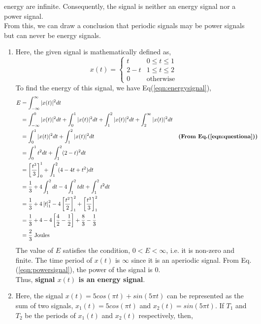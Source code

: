 \documentclass{article}[12 pt]
\begin{document}
\begin{solution}
{energy are infinite. Consequently, the signal is neither an energy signal nor a
power signal.\\From this, we can draw a conclusion that periodic signals may be power signals but can never be energy signals.
\begin{enumerate}
\item Here, the given signal is mathematically defined as,
\begin{equation}
\label{eqn:questiona}
x(t)=\begin{cases}
  t & 0 \leq t \leq 1\\
  2-t & 1 \leq t \leq 2\\
  0 & \text{otherwise}
\end{cases}
\end{equation}
To find the energy of this signal, we have Eq(\ref{eqn:energysignal}),
\begin{equation*}
\begin{aligned}
E&=\int_{-\infty}^\infty |x(t)|^2 dt\\
&=\int_{-\infty}^0 |x(t)|^2 dt +\int_{0}^1 |x(t)|^2 dt + \int_{1}^2 |x(t)|^2 dt +\int_{2}^\infty |x(t)|^2 dt\\
&=\int_{0}^1 |x(t)|^2 dt + \int_{1}^2 |x(t)|^2 dt && \textbf{(From Eq.(\ref{eqn:questiona}))}\\
&=\int_{0}^1 t^2 dt + \int_{1}^2 (2-t)^2 dt\\
&=\left[\frac{t^3}{3}\right]_0^1+\int_{1}^2 (4-4t+t^2) dt\\
&=\frac{1}{3}+4\int_{1}^2 dt-4\int_{1}^2 t dt+\int_{1}^2 t^2 dt\\
&=\frac{1}{3}+4\left[t\right]_1^2-4\left[\frac{t^2}{2}\right]_1^2+\left[\frac{t^3}{3}\right]_1^2\\
&=\frac{1}{3}+4-4\left[\frac{4}{2}-\frac{1}{2}\right]+\frac{8}{3}-\frac{1}{3}\\
&=\frac{2}{3}\text{ Joules}
\end{aligned}
\end{equation*}
The value of $E$ satisfies the condition, $0<E<\infty$, i.e. it is non-zero and finite. The time period of $x(t)$ is $\infty$ since it is an aperiodic signal. From Eq.({\ref{eqn:powersignal}}), the power of the signal is 0.\\
Thus, \textbf{signal $x(t)$ is an energy signal}.
\item Here, the signal $x(t)=5cos(\pi t) + sin (5 \pi t)$ can be represented as the sum of two signals, $x_1(t)=5cos(\pi t)$ and $x_2(t)=sin (5 \pi t)$. If $T_1$ and $T_2$ be the periods of $x_1(t)$ and $x_2(t)$ respectively, then,\\

\end{enumerate}}
\end{solution}
\end{document}
